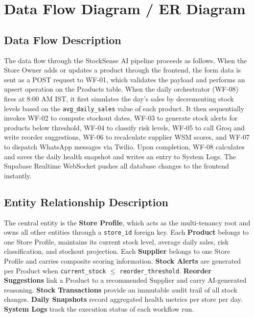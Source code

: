 \section{Data Flow Diagram / ER Diagram}

\subsection{Data Flow Description}

The data flow through the StockSense AI pipeline proceeds as follows. When the Store Owner adds
or updates a product through the frontend, the form data is sent as a POST request to WF-01,
which validates the payload and performs an upsert operation on the Products table. When the
daily orchestrator (WF-08) fires at 8:00 AM IST, it first simulates the day's sales by
decrementing stock levels based on the \texttt{avg\_daily\_sales} value of each product. It
then sequentially invokes WF-02 to compute stockout dates, WF-03 to generate stock alerts for
products below threshold, WF-04 to classify risk levels, WF-05 to call Groq and write reorder
suggestions, WF-06 to recalculate supplier WSM scores, and WF-07 to dispatch WhatsApp messages
via Twilio. Upon completion, WF-08 calculates and saves the daily health snapshot and writes an
entry to System Logs. The Supabase Realtime WebSocket pushes all database changes to the
frontend instantly.

\subsection{Entity Relationship Description}

The central entity is the \textbf{Store Profile}, which acts as the multi-tenancy root and owns
all other entities through a \texttt{store\_id} foreign key. Each \textbf{Product} belongs to
one Store Profile, maintains its current stock level, average daily sales, risk classification,
and stockout projection. Each \textbf{Supplier} belongs to one Store Profile and carries
composite scoring information. \textbf{Stock Alerts} are generated per Product when
\texttt{current\_stock} $\leq$ \texttt{reorder\_threshold}. \textbf{Reorder Suggestions} link
a Product to a recommended Supplier and carry AI-generated reasoning. \textbf{Stock
Transactions} provide an immutable audit trail of all stock changes. \textbf{Daily Snapshots}
record aggregated health metrics per store per day. \textbf{System Logs} track the execution
status of each workflow run.

